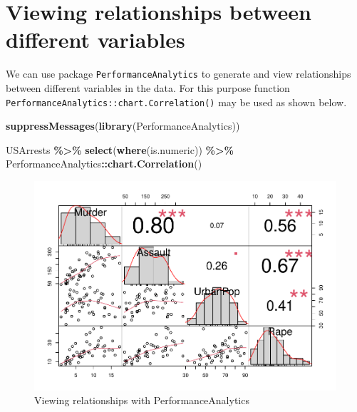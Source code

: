 \documentclass[
]{book}
\newenvironment{Shaded}{\begin{snugshade}}{\end{snugshade}}
\newcommand{\FunctionTok}[1]{\textcolor[rgb]{0.13,0.29,0.53}{\textbf{#1}}}
\newcommand{\NormalTok}[1]{#1}
\newcommand{\SpecialCharTok}[1]{\textcolor[rgb]{0.81,0.36,0.00}{\textbf{#1}}}
\begin{document}
\hypertarget{viewing-relationships-between-different-variables}{%
\section{Viewing relationships between different variables}\label{viewing-relationships-between-different-variables}}

We can use package \texttt{PerformanceAnalytics} to generate and view relationships between different variables in the data. For this purpose function \texttt{PerformanceAnalytics::chart.Correlation()} may be used as shown below.

\begin{Shaded}
\begin{Highlighting}[]
\FunctionTok{suppressMessages}\NormalTok{(}\FunctionTok{library}\NormalTok{(PerformanceAnalytics))}

\NormalTok{USArrests }\SpecialCharTok{\%\textgreater{}\%} 
  \FunctionTok{select}\NormalTok{(}\FunctionTok{where}\NormalTok{(is.numeric)) }\SpecialCharTok{\%\textgreater{}\%} 
\NormalTok{  PerformanceAnalytics}\SpecialCharTok{::}\FunctionTok{chart.Correlation}\NormalTok{()}
\end{Highlighting}
\end{Shaded}

\begin{figure}

{\centering \includegraphics{DauR_files/figure-latex/unnamed-chunk-321-1} 

}

\caption{Viewing relationships with PerformanceAnalytics}\label{fig:unnamed-chunk-321}
\end{figure}
\end{document}
